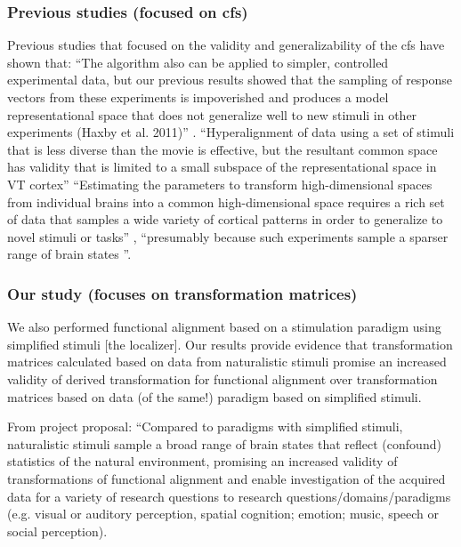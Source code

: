 

\subsubsection{Previous studies (focused on \ac{cfs})}

Previous studies \citep{guntupalli2016model, haxby2020hyperalignment} that
focused on the validity and generalizability of the \ac{cfs} have shown that:
%
``The algorithm also can be applied to simpler, controlled experimental data,
but our previous results showed that the sampling of response vectors from these
experiments is impoverished and produces a model representational space that
does not generalize well to new stimuli in other experiments (Haxby et al.
2011)'' \citep{guntupalli2016model}.
%
``Hyperalignment of data using a set of stimuli that is less diverse than the
movie is effective, but the resultant common space has validity that is limited
to a small subspace of the representational space in VT cortex''
\citep{haxby2011common}
%
``Estimating the parameters to transform high-dimensional spaces from individual
brains into a common high-dimensional space requires a rich set of data that
samples a wide variety of cortical patterns in order to generalize to novel
stimuli or tasks'' \citep{haxby2020hyperalignment}, ``presumably because such
experiments sample a sparser range of brain states
\citep{guntupalli2016model}''.

\subsubsection{Our study (focuses on transformation matrices)}
%
We also performed functional alignment based on a stimulation paradigm using
simplified stimuli [the localizer].
%
Our results provide evidence that transformation matrices calculated based on
data from naturalistic stimuli promise an increased validity of derived
transformation for functional alignment over transformation matrices based on
data (of the same!) paradigm based on simplified stimuli.

From project proposal: ``Compared to paradigms with simplified stimuli,
naturalistic stimuli sample a broad range of brain states
\citep{guntupalli2016model, haxby2011common} that reflect (confound) statistics
of the natural environment, promising an increased validity of transformations
of functional alignment and enable investigation of the acquired data for a
variety of research questions to research questions/domains/paradigms (e.g.
visual or auditory perception, spatial cognition; emotion; music, speech or
social perception).


